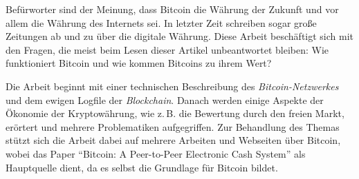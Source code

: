Befürworter sind der Meinung, dass Bitcoin die Währung der Zukunft und vor allem die Währung des Internets sei.
In letzter Zeit schreiben sogar große Zeitungen ab und zu über die digitale Währung.
Diese Arbeit beschäftigt sich mit den Fragen, die meist beim Lesen dieser Artikel unbeantwortet bleiben:
Wie funktioniert Bitcoin und wie kommen Bitcoins zu ihrem Wert?

Die Arbeit beginnt mit einer technischen Beschreibung des \emph{Bitcoin-Netzwerkes} und dem ewigen Logfile der \emph{Blockchain}.
Danach werden einige Aspekte der Ökonomie der Kryptowährung, wie z.\,B. die Bewertung durch den freien Markt, erörtert und mehrere Problematiken aufgegriffen.
Zur Behandlung des Themas stützt sich die Arbeit dabei auf mehrere Arbeiten und Webseiten über Bitcoin, wobei das Paper "`Bitcoin: A Peer-to-Peer Electronic Cash System"' als Hauptquelle dient, da es selbst die Grundlage für Bitcoin bildet.
